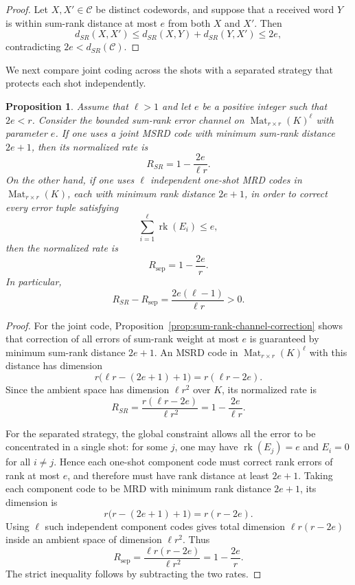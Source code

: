 \documentclass[10pt,a4paper]{amsart}
\DeclareMathOperator{\Mat}{Mat}
\DeclareMathOperator{\rk}{rk}
\theoremstyle{definition}
\theoremstyle{plain}
\newtheorem{proposition}[definition]{Proposition}
\theoremstyle{remark}
\begin{document}
\begin{proof}
Let $X,X'\in\mathcal C$ be distinct codewords, and suppose that a received word $Y$ is within sum-rank distance at most $e$ from both $X$ and $X'$. Then
$$
d_{SR}(X,X')
\leq
d_{SR}(X,Y)+d_{SR}(Y,X')
\leq 2e,
$$
contradicting $2e<d_{SR}(\mathcal C)$.
\end{proof}

We next compare joint coding across the shots with a separated strategy that protects each shot independently.

\begin{proposition}
\label{prop:joint-sum-rank-rate-advantage}
Assume that $\ell>1$ and let $e$ be a positive integer such that $2e<r$. Consider the bounded sum-rank error channel on $\Mat_{r\times r}(K)^\ell$ with parameter $e$. If one uses a joint MSRD code with minimum sum-rank distance $2e+1$, then its normalized rate is
$$
R_{SR}=1-\frac{2e}{\ell r}.
$$
On the other hand, if one uses $\ell$ independent one-shot MRD codes in $\Mat_{r\times r}(K)$, each with minimum rank distance $2e+1$, in order to correct every error tuple satisfying
$$
\sum_{i=1}^{\ell}\rk(E_i)\leq e,
$$
then the normalized rate is
$$
R_{\mathrm{sep}}=1-\frac{2e}{r}.
$$
In particular,
$$
R_{SR}-R_{\mathrm{sep}}
=
\frac{2e(\ell-1)}{\ell r}
>
0.
$$
\end{proposition}

\begin{proof}
For the joint code, Proposition~\ref{prop:sum-rank-channel-correction} shows that correction of all errors of sum-rank weight at most $e$ is guaranteed by minimum sum-rank distance $2e+1$. An MSRD code in $\Mat_{r\times r}(K)^\ell$ with this distance has dimension
$$
r\bigl(\ell r-(2e+1)+1\bigr)
=
r(\ell r-2e).
$$
Since the ambient space has dimension $\ell r^2$ over $K$, its normalized rate is
$$
R_{SR}
=
\frac{r(\ell r-2e)}{\ell r^2}
=
1-\frac{2e}{\ell r}.
$$

For the separated strategy, the global constraint allows all the error to be concentrated in a single shot: for some $j$, one may have $\rk(E_j)=e$ and $E_i=0$ for all $i\neq j$. Hence each one-shot component code must correct rank errors of rank at most $e$, and therefore must have rank distance at least $2e+1$. Taking each component code to be MRD with minimum rank distance $2e+1$, its dimension is
$$
r\bigl(r-(2e+1)+1\bigr)
=
r(r-2e).
$$
Using $\ell$ such independent component codes gives total dimension $\ell r(r-2e)$ inside an ambient space of dimension $\ell r^2$. Thus
$$
R_{\mathrm{sep}}
=
\frac{\ell r(r-2e)}{\ell r^2}
=
1-\frac{2e}{r}.
$$
The strict inequality follows by subtracting the two rates.
\end{proof}
\end{document}
